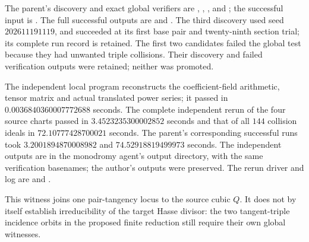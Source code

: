 \begin{remark}
The parent's discovery and exact global verifiers are
,
,
, and
; the successful input is
. The full successful outputs are
 and
.
The third discovery used seed $202611191119$, and succeeded at its
first base pair and twenty-ninth section trial; its complete run
record is retained. The first two candidates failed the global test
because they had unwanted triple collisions. Their discovery and
failed verification outputs were retained; neither was promoted.

The independent local program
reconstructs the coefficient-field arithmetic, tensor matrix and
actual translated power series; it passed in
$0.0036840360007772688$ seconds.
The complete independent rerun of the four source charts passed in
$3.4523235300002852$ seconds and that of all $144$ collision ideals in
$72.10777428700021$ seconds. The parent's corresponding successful
runs took $3.2001894870008982$ and $74.52918819499973$ seconds.
The independent outputs are in the monodromy agent's output directory,
with the same verification basenames; the author's outputs were
preserved. The rerun driver and log are
 and
.

This witness joins one pair-tangency locus to the source cubic $Q$.
It does not by itself establish irreducibility of the target Hasse
divisor: the two tangent-triple incidence orbits in the proposed
finite reduction still require their own global witnesses.
\end{remark}
